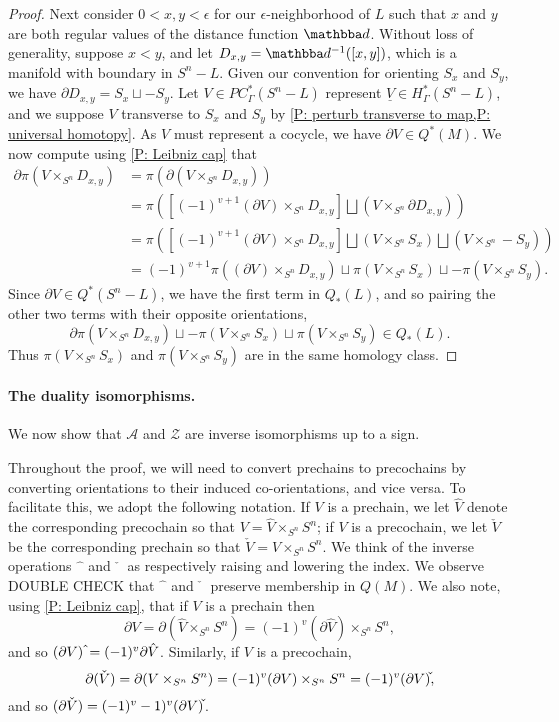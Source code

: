\documentclass[12pt]{article}
\theoremstyle{plain}
\theoremstyle{definition}
\theoremstyle{remark}
\newcommand{\uV}{\underline{V}}
\newcommand{\bd}{\partial}
\newcommand{\mc}[1]{\mathcal{#1}}
\begin{document}
\begin{proof}
Next consider $0 < x, y < \epsilon$ for our $\epsilon$-neighborhood of $L$ such that $x$ and $y$ are both regular values of the distance function $\mathbba d$.
Without loss of generality, suppose $x < y$, and let $D_{x,y} = \mathbba d^{-1}([x,y])$, which is a manifold with boundary in $S^n-L$.
Given our convention for orienting $S_x$ and $S_y$, we have $\bd D_{x,y} = S_x \sqcup -S_y$.
Let $V \in PC^*_\Gamma(S^n-L)$ represent $\uV \in H^*_\Gamma(S^n - L)$, and we suppose $V$ transverse to $S_x$ and $S_y$ by \cref{P: perturb transverse to map,P: universal homotopy}.
As $V$ must represent a cocycle, we have $\bd V \in Q^*(M)$.
We now compute using \cref{P: Leibniz cap} that
\begin{align*}
\bd \pi(V \times_{S^n} D_{x,y}) &= \pi(\bd (V \times_{S^n} D_{x,y}))\\
&= \pi\left(\left[(-1)^{v+1} (\bd V) \times_{S^n}D_{x,y} \right] \bigsqcup (V \times_{S^n} \bd D_{x,y})\right)\\
&= \pi\left(\left[(-1)^{v+1} (\bd V) \times_{S^n}D_{x,y} \right] \bigsqcup (V \times_{S^n} S_x)\bigsqcup (V \times_{S^n} -S_y)\right)\\
&=(-1)^{v+1} \pi((\bd V) \times_{S^n}D_{x,y}) \sqcup \pi(V \times_{S^n} S_x) \sqcup -\pi(V \times_{S^n} S_y).
\end{align*}
Since $\bd V \in Q^*(S^n-L)$, we have the first term in $Q_*(L)$, and so pairing the other two terms with their opposite orientations,
$$\bd \pi(V \times_{S^n} D_{x,y})\sqcup -\pi(V \times_{S^n} S_x) \sqcup \pi(V \times_{S^n} S_y) \in Q_*(L).$$
Thus $\pi(V \times_{S^n} S_x)$ and $\pi(V \times_{S^n} S_y)$ are in the same homology class.
\end{proof}


\paragraph{The duality isomorphisms.} We now show that $\mc A$ and $\mc Z$ are inverse isomorphisms up to a sign.

Throughout the proof, we will need to convert prechains to precochains by converting orientations to their induced co-orientations, and vice versa.
To facilitate this, we adopt the following notation.
If $V$ is a prechain, we let $\hat V$ denote the corresponding precochain so that $V = \hat V \times_{S^n} S^n$; if $V$ is a precochain, we let $\check V$ be the corresponding prechain so that $\check V = V \times_{S^n} S^n$.
We think of the inverse operations $\hat{\phantom{a}}$ and $\check{\phantom{a}}$ as respectively raising and lowering the index.
We observe DOUBLE CHECK that $\hat{\phantom{a}}$ and $\check{\phantom{a}}$ preserve membership in $Q(M)$.
We also note, using \cref{P: Leibniz cap}, that if $V$ is a prechain then
 $$\bd V = \bd(\hat V \times_{S^n} S^n) = (-1)^{v} (\bd \hat V) \times_{S^n} S^n,$$
and so $(\bd V)\,\hat{\vrule height1.3ex width0pt} = (-1)^{v} \bd \hat V$.
Similarly, if $V$ is a precochain,  $$\bd(\check V) = \bd(V \times_{S^n} S^n) = (-1)^{v} (\bd V) \times_{S^n} S^n = (-1)^v (\bd V)\check{\vrule height1.3ex width0pt},$$
and so $(\bd \check V) = (-1)^{v} -1)^v (\bd V)\check{\vrule height1.3ex width0pt}$.
\end{document}
